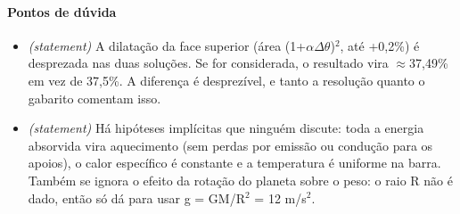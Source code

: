 \documentclass{article}%
\begin{document}
\paragraph{Pontos de dúvida}%
\begin{itemize}%
\item%
\textit{(statement)} A dilatação da face superior (área (1+$\alpha$$\Delta$$\theta$)$^2$, até +0,2\%) é desprezada nas duas soluções. Se for considerada, o resultado vira $\approx$37,49\% em vez de 37,5\%. A diferença é desprezível, e tanto a resolução quanto o gabarito comentam isso.%
\item%
\textit{(statement)} Há hipóteses implícitas que ninguém discute: toda a energia absorvida vira aquecimento (sem perdas por emissão ou condução para os apoios), o calor específico é constante e a temperatura é uniforme na barra. Também se ignora o efeito da rotação do planeta sobre o peso: o raio R não é dado, então só dá para usar g = GM/R$^2$ = 12 m/s$^2$.%
\end{itemize}%
\end{document}
